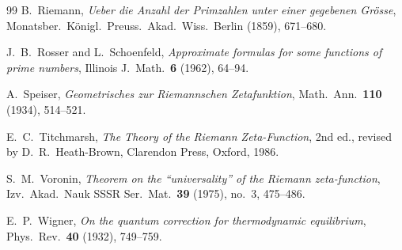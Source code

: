 \documentclass[11pt,reqno]{amsart}
\theoremstyle{plain}
\theoremstyle{definition}
\theoremstyle{remark}
\numberwithin{equation}{section}
\begin{document}
\begin{thebibliography}{99}
B.~Riemann, \emph{Ueber die Anzahl der Primzahlen unter einer gegebenen Gr\"osse}, Monatsber.\ K\"onigl.\ Preuss.\ Akad.\ Wiss.\ Berlin (1859), 671--680.

J.~B.~Rosser and L.~Schoenfeld, \emph{Approximate formulas for some functions of prime numbers}, Illinois J.\ Math.\ \textbf{6} (1962), 64--94.

A.~Speiser, \emph{Geometrisches zur Riemannschen Zetafunktion}, Math.\ Ann.\ \textbf{110} (1934), 514--521.

E.~C.~Titchmarsh, \emph{The Theory of the Riemann Zeta-Function}, 2nd ed., revised by D.~R.~Heath-Brown, Clarendon Press, Oxford, 1986.

S.~M.~Voronin, \emph{Theorem on the ``universality'' of the Riemann zeta-function}, Izv.\ Akad.\ Nauk SSSR Ser.\ Mat.\ \textbf{39} (1975), no.~3, 475--486.

E.~P.~Wigner, \emph{On the quantum correction for thermodynamic equilibrium}, Phys.\ Rev.\ \textbf{40} (1932), 749--759.

\end{thebibliography}
\end{document}
